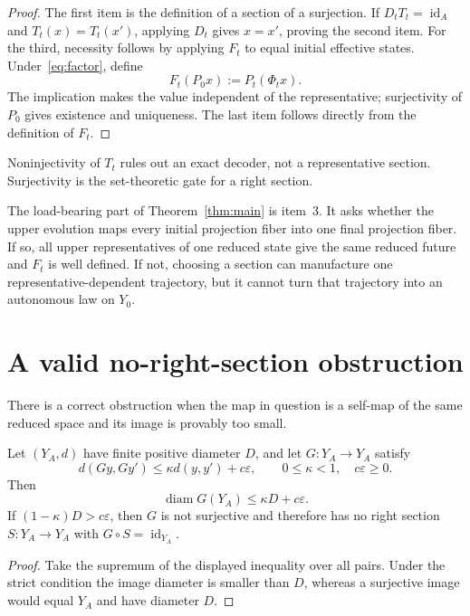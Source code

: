 \documentclass[11pt]{article}
\begin{document}
\begin{proof}
The first item is the definition of a section of a surjection. If
$D_tT_t=\operatorname{id}_A$ and $T_t(x)=T_t(x')$, applying $D_t$ gives
$x=x'$, proving the second item. For the third, necessity follows by applying
$F_t$ to equal initial effective states. Under~\eqref{eq:factor}, define
\[
 F_t(P_0x):=P_t(\Phi_tx).
\]
The implication makes the value independent of the representative;
surjectivity of $P_0$ gives existence and uniqueness. The last item follows
directly from the definition of $F_t$.
\end{proof}

\begin{corollary}
Noninjectivity of $T_t$ rules out an exact decoder, not a representative
section. Surjectivity is the set-theoretic gate for a right section.
\end{corollary}

The load-bearing part of Theorem~\ref{thm:main} is item~3.  It asks whether
the upper evolution maps every initial projection fiber into one final
projection fiber.  If so, all upper representatives of one reduced state give
the same reduced future and $F_t$ is well defined.  If not, choosing a section
can manufacture one representative-dependent trajectory, but it cannot turn
that trajectory into an autonomous law on $Y_0$.

\section{A valid no-right-section obstruction}

There is a correct obstruction when the map in question is a self-map of the
same reduced space and its image is provably too small.

\begin{theorem}\label{thm:diameter}
Let $(Y_A,d)$ have finite positive diameter $D$, and let
$G:Y_A\to Y_A$ satisfy
\[
 d(Gy,Gy')\le\kappa d(y,y')+c\varepsilon,
 \qquad0\le\kappa<1,\quad c\varepsilon\ge0.
\]
Then
\[
 \operatorname{diam}G(Y_A)\le\kappa D+c\varepsilon.
\]
If $(1-\kappa)D>c\varepsilon$, then $G$ is not surjective and therefore has no
right section $S:Y_A\to Y_A$ with $G\circ S=\operatorname{id}_{Y_A}$.
\end{theorem}

\begin{proof}
Take the supremum of the displayed inequality over all pairs. Under the strict
condition the image diameter is smaller than $D$, whereas a surjective image
would equal $Y_A$ and have diameter $D$.
\end{proof}
\end{document}
